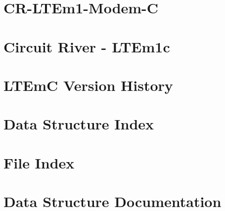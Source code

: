 \let\mypdfximage\pdfximage\def\pdfximage{\immediate\mypdfximage}\documentclass[twoside]{book}
\newcommand{\+}{\discretionary{\mbox{\scriptsize$\hookleftarrow$}}{}{}}
\begin{document}
\chapter{C\+R-\/\+L\+T\+Em1-\/\+Modem-\/C}
\label{md_tests__l_t_em_c-2-components__r_e_a_d_m_e}

\chapter{Circuit River -\/ L\+T\+Em1c}
\label{md_tests__l_t_em_c-8-mqtt__r_e_a_d_m_e}

\chapter{L\+T\+EmC Version History}
\label{md_version-history}

\chapter{Data Structure Index}

\chapter{File Index}

\chapter{Data Structure Documentation}


































\end{document}
